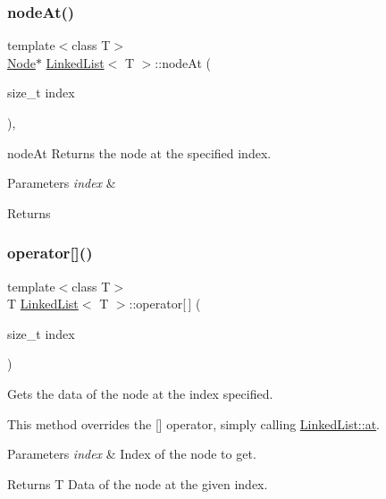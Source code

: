 \subsubsection{\texorpdfstring{node\+At()}{nodeAt()}}
{\footnotesize\ttfamily template$<$class T$>$ \\
\hyperlink{structLinkedList_1_1Node}{Node}$\ast$ \hyperlink{classLinkedList}{Linked\+List}$<$ T $>$\+::node\+At (\begin{DoxyParamCaption}\item[{size\+\_\+t}]{index }\end{DoxyParamCaption})\hspace{0.3cm}{\ttfamily [inline]}, {\ttfamily [private]}}



node\+At Returns the node at the specified index. 


\begin{DoxyParams}{Parameters}
{\em index} & \\
\hline
\end{DoxyParams}
\begin{DoxyReturn}{Returns}

\end{DoxyReturn}
\mbox{\label{classLinkedList_a83a2aadda160e4f1160b35fd64f72207}} 
\subsubsection{\texorpdfstring{operator[]()}{operator[]()}}
{\footnotesize\ttfamily template$<$class T$>$ \\
T \hyperlink{classLinkedList}{Linked\+List}$<$ T $>$\+::operator\mbox{[}$\,$\mbox{]} (\begin{DoxyParamCaption}\item[{size\+\_\+t}]{index }\end{DoxyParamCaption})\hspace{0.3cm}{\ttfamily [inline]}}



Gets the data of the node at the index specified. 

This method overrides the \mbox{[}\mbox{]} operator, simply calling \hyperlink{classLinkedList_a2793ba03677f44075c0529dffe0b0d5a}{Linked\+List\+::at}.


\begin{DoxyParams}{Parameters}
{\em index} & Index of the node to get.\\
\hline
\end{DoxyParams}
\begin{DoxyReturn}{Returns}
T Data of the node at the given index. 
\end{DoxyReturn}
\mbox{\label{classLinkedList_a3a1e6c2009b611fb4416574178b316a3}} 
